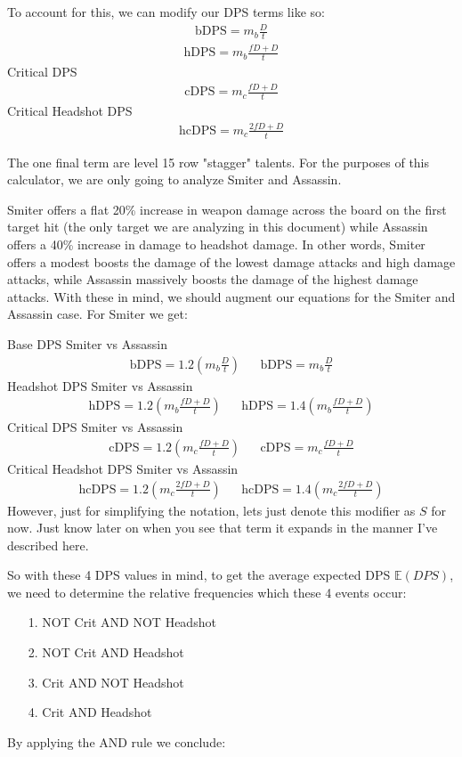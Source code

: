 \documentclass{article}
\begin{document}
To account for this, we can modify our DPS terms like so:
\begin{align*}
\text{bDPS} = m_b \frac{D}{t}
\end{align*}
\begin{align*}
\text{hDPS} = m_b \frac{fD+D}{t}
\end{align*}
Critical DPS
\begin{align*}
\text{cDPS} = m_c \frac{fD+D}{t}
\end{align*}
Critical Headshot DPS
\begin{align*}
\text{hcDPS} = m_c \frac{ 2fD + D}{t}
\end{align*}

The one final term are level 15 row "stagger" talents. For the purposes of this calculator, we are only going to analyze Smiter and Assassin.

Smiter offers a flat 20\% increase in weapon damage across the board on the first target hit (the only target we are analyzing in this document) while Assassin offers a 40\% increase in damage to headshot damage. In other words, Smiter offers a modest boosts the damage of the lowest damage attacks and high damage attacks, while Assassin massively boosts the damage of the highest damage attacks. With these in mind, we should augment our equations for the Smiter and Assassin case. For Smiter we get:

Base DPS Smiter vs Assassin
\begin{align*}
\text{bDPS} = 1.2 (m_b \frac{D}{t}) && \text{bDPS} = m_b \frac{D}{t} 
\end{align*}
Headshot DPS Smiter vs Assassin
\begin{align*}
\text{hDPS} = 1.2(m_b \frac{fD + D}{t} ) && \text{hDPS} = 1.4(m_b \frac{fD + D}{t} )
\end{align*}
Critical DPS Smiter vs Assassin
\begin{align*}
\text{cDPS} = 1.2( m_c \frac{fD + D}{t} ) && \text{cDPS} = m_c \frac{ fD + D}{t}
\end{align*}
Critical Headshot DPS Smiter vs Assassin
\begin{align*}
\text{hcDPS} = 1.2( m_c \frac{ 2fD + D}{t} ) && \text{hcDPS} = 1.4( m_c \frac{ 2fD + D }{t} )
\end{align*}
However, just for simplifying the notation, lets just denote this modifier as $S$ for now. Just know later on when you see that term it expands in the manner I've described here.

So with these 4 DPS values in mind, to get the average expected DPS $\mathbb{E}(DPS)$, we need to determine the relative frequencies which these 4 events occur:
\begin{enumerate}
\item[1.] NOT Crit AND NOT Headshot
\item[2.] NOT Crit AND Headshot
\item[3.] Crit AND NOT Headshot
\item[4.] Crit AND Headshot
\end{enumerate}
By applying the AND rule we conclude:
\end{document}
